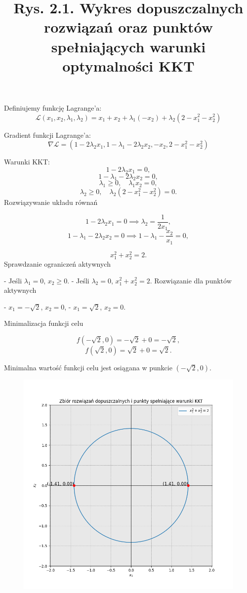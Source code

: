 \documentclass{article}
\begin{document}
Definiujemy funkcję Lagrange'a:
\[
\mathcal{L}(x_1, x_2, \lambda_1, \lambda_2) = x_1 + x_2 + \lambda_1 (-x_2) + \lambda_2 (2 - x_1^2 - x_2^2)
\]

Gradient funkcji Lagrange'a:
\[
\nabla \mathcal{L} = \left( 1 - 2\lambda_2 x_1, 1 - \lambda_1 - 2\lambda_2 x_2, -x_2, 2 - x_1^2 - x_2^2 \right)
\]

Warunki KKT:
\[
1 - 2\lambda_2 x_1 = 0,
\]
\[
1 - \lambda_1 - 2\lambda_2 x_2 = 0,
\]
\[
\lambda_1 \geq 0, \quad \lambda_1 x_2 = 0,
\]
\[
\lambda_2 \geq 0, \quad \lambda_2 (2 - x_1^2 - x_2^2) = 0.
\]
Rozwiązywanie układu równań

\[
1 - 2\lambda_2 x_1 = 0 \implies \lambda_2 = \frac{1}{2x_1},
\]
\[
1 - \lambda_1 - 2\lambda_2 x_2 = 0 \implies 1 - \lambda_1 - \frac{x_2}{x_1} = 0,
\]

\[
x_1^2 + x_2^2 = 2.
\]
Sprawdzanie ograniczeń aktywnych

- Jeśli \(\lambda_1 = 0\), \(x_2 \geq 0\).
- Jeśli \(\lambda_2 = 0\), \(x_1^2 + x_2^2 = 2\).
Rozwiązanie dla punktów aktywnych

- \(x_1 = -\sqrt{2}\), \(x_2 = 0\),
- \(x_1 = \sqrt{2}\), \(x_2 = 0\).

Minimalizacja funkcji celu

\[
f(-\sqrt{2}, 0) = -\sqrt{2} + 0 = -\sqrt{2},
\]
\[
f(\sqrt{2}, 0) = \sqrt{2} + 0 = \sqrt{2}.
\]

Minimalna wartość funkcji celu jest osiągana w punkcie \((- \sqrt{2}, 0)\).
\begin{figure}[h]
    \includegraphics[scale=0.4]{zadanie2.png}
    \title{\newline Rys. 2.1. Wykres dopuszczalnych rozwiązań oraz punktów spełniających warunki optymalności KKT}
    \centering
  \end{figure}
\newpage
\end{document}
